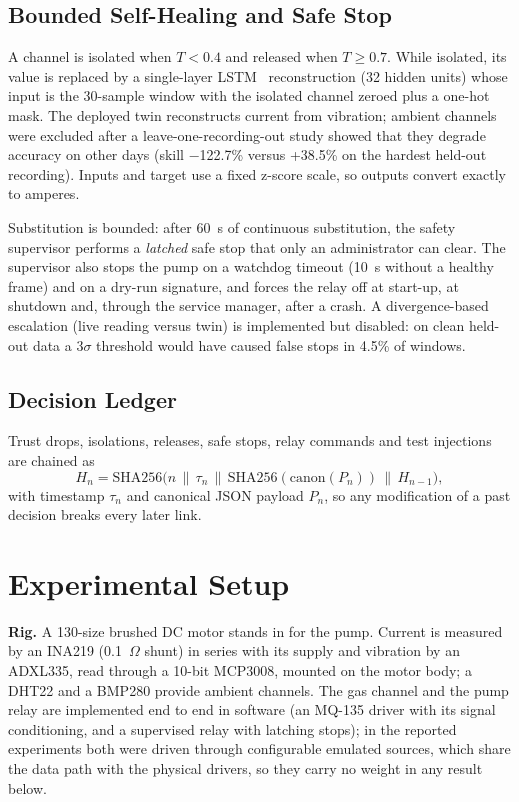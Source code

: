 \documentclass[conference]{IEEEtran}
\begin{document}
\subsection{Bounded Self-Healing and Safe Stop}

A channel is isolated when $T < 0.4$ and released when $T \geq 0.7$. While isolated, its value is replaced by a single-layer LSTM~\cite{hochreiter1997lstm} reconstruction (32 hidden units) whose input is the 30-sample window with the isolated channel zeroed plus a one-hot mask. The deployed twin reconstructs current from vibration; ambient channels were excluded after a leave-one-recording-out study showed that they degrade accuracy on other days (skill $-$122.7\% versus +38.5\% on the hardest held-out recording). Inputs and target use a fixed z-score scale, so outputs convert exactly to amperes.

Substitution is bounded: after 60~s of continuous substitution, the safety supervisor performs a \emph{latched} safe stop that only an administrator can clear. The supervisor also stops the pump on a watchdog timeout (10~s without a healthy frame) and on a dry-run signature, and forces the relay off at start-up, at shutdown and, through the service manager, after a crash. A divergence-based escalation (live reading versus twin) is implemented but disabled: on clean held-out data a $3\sigma$ threshold would have caused false stops in 4.5\% of windows.

\subsection{Decision Ledger}

Trust drops, isolations, releases, safe stops, relay commands and test injections are chained as
\begin{equation}
H_n = \mathrm{SHA256}\big(n \,\|\, \tau_n \,\|\, \mathrm{SHA256}(\mathrm{canon}(P_n)) \,\|\, H_{n-1}\big),
\end{equation}
with timestamp $\tau_n$ and canonical JSON payload $P_n$, so any modification of a past decision breaks every later link.

\section{Experimental Setup}

\textbf{Rig.} A 130-size brushed DC motor stands in for the pump. Current is measured by an INA219 (0.1~$\Omega$ shunt) in series with its supply and vibration by an ADXL335, read through a 10-bit MCP3008, mounted on the motor body; a DHT22 and a BMP280 provide ambient channels. The gas channel and the pump relay are implemented end to end in software (an MQ-135 driver with its signal conditioning, and a supervised relay with latching stops); in the reported experiments both were driven through configurable emulated sources, which share the data path with the physical drivers, so they carry no weight in any result below.
\end{document}
